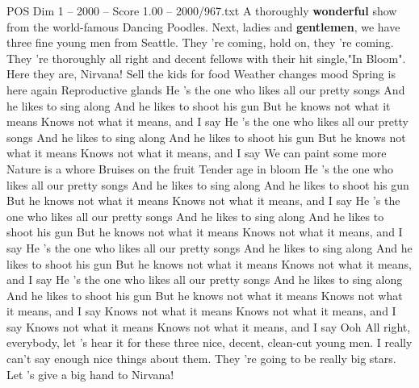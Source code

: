 \begin{textsample}{POS Dim 1 – 2000 – Score 1.00 – 2000/967.txt}  \label{ex:f1_pos_034}
A thoroughly \textbf{wonderful} show from the world-famous Dancing Poodles.
Next, ladies and \textbf{gentlemen}, we have three fine young men from Seattle.
They 're coming, hold on, they 're coming.
They 're thoroughly all right and decent fellows with their hit single,"In Bloom".
Here they are, Nirvana!
Sell the kids for food Weather changes mood Spring is here again Reproductive glands He 's the one who likes all our pretty songs And he likes to sing along And he likes to shoot his gun But he knows not what it means Knows not what it means, and I say He 's the one who likes all our pretty songs And he likes to sing along And he likes to shoot his gun But he knows not what it means Knows not what it means, and I say We can paint some more Nature is a whore Bruises on the fruit Tender age in bloom He 's the one who likes all our pretty songs And he likes to sing along And he likes to shoot his gun But he knows not what it means Knows not what it means, and I say He 's the one who likes all our pretty songs And he likes to sing along And he likes to shoot his gun But he knows not what it means Knows not what it means, and I say He 's the one who likes all our pretty songs And he likes to sing along And he likes to shoot his gun But he knows not what it means Knows not what it means, and I say He 's the one who likes all our pretty songs And he likes to sing along And he likes to shoot his gun But he knows not what it means Knows not what it means, and I say Knows not what it means Knows not what it means, and I say Knows not what it means Knows not what it means, and I say Ooh All right, everybody, let 's hear it for these three nice, decent, clean-cut young men.
I really can't say enough nice things about them.
They 're going to be really big stars.
Let 's give a big hand to Nirvana!

\end{textsample}
